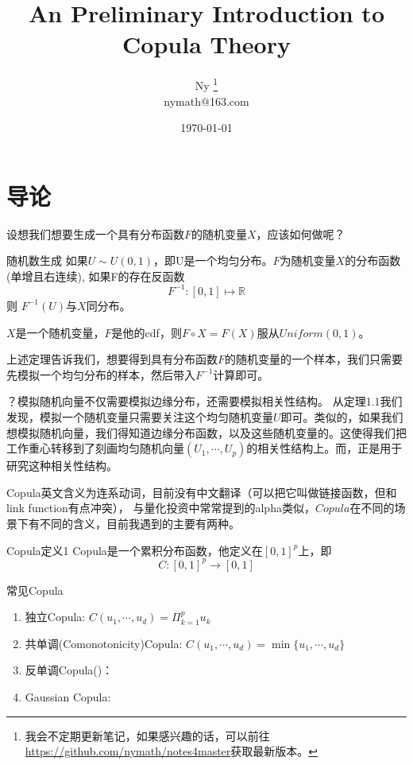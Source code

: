 \documentclass[12pt]{article}
\theoremstyle{definition}
\newcommand{\R}{\mathbb{R}}
\begin{document}
	\title{An Preliminary Introduction to Copula Theory}
	\author{Ny 
	\footnote{我会不定期更新笔记，如果感兴趣的话，可以前往
	\href{https://github.com/nymath/notes4master}{https://github.com/nymath/notes4master}获取最新版本。}\\
	nymath@163.com}
	\date{\today}
	\maketitle
	\tableofcontents
	\listoffigures
\newpage
\section{导论}
设想我们想要生成一个具有分布函数$F$的随机变量$X$，应该如何做呢？
\begin{stheorem}{随机数生成}{}
如果$U\sim U(0,1)$，即U是一个均匀分布。$F$为随机变量$X$的分布函数(单增且右连续), 如果F的存在反函数
$$
F^{-1}: [0,1] \mapsto \R
$$
则
$F^{-1}(U)$与$X$同分布。

\end{stheorem}
\begin{sremark}{}{}
$X$是一个随机变量，$F$是他的cdf，则$F \circ X = F(X)$服从$Uniform(0,1)$。	
\end{sremark}
上述定理告诉我们，想要得到具有分布函数$F$的随机变量的一个样本，我们只需要先模拟一个均匀分布的样本，然后带入$F^{-1}$计算即可。\par

？模拟随机向量不仅需要模拟边缘分布，还需要模拟相关性结构。 从定理1.1我们发现，模拟一个随机变量只需要关注这个均匀随机变量$U$即可。类似的，如果我们想模拟随机向量，我们得知道边缘分布函数，以及这些随机变量的。这使得我们把工作重心转移到了刻画均匀随机向量$(U_1,\cdots,U_p)$的相关性结构上。而，正是用于研究这种相关性结构。 \par
Copula英文含义为连系动词，目前没有中文翻译（可以把它叫做链接函数，但和link function有点冲突），
与量化投资中常常提到的alpha类似，$Copula$在不同的场景下有不同的含义，目前我遇到的主要有两种。




\begin{sdefinition}{Copula定义1}{}
Copula是一个累积分布函数，他定义在$[0,1]^p$上，即
$$
C: [0,1]^p \to [0,1]
$$
\end{sdefinition}

\begin{sexample}{常见Copula}{}
\begin{enumerate}
	\item 独立Copula: $C(u_1,\cdots,u_d) = \Pi_{k=1}^p u_k$
	\item 共单调(Comonotonicity)Copula: $C(u_1,\cdots,u_d) = \min\{u_1,\cdots,u_d\}$
	\item 反单调Copula()：
	\item Gaussian Copula: 
\end{enumerate}
\end{sexample}
\end{document}
